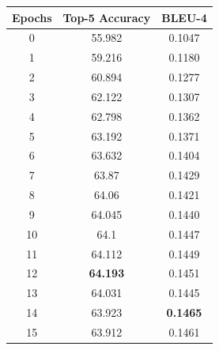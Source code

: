\documentclass[11pt,a4paper]{article}
\begin{document}
\begin{table}
\centering
\begin{tabular}{|c|c|c|} 
\hline
\rowcolor[rgb]{0.761,0.761,0.761} \textbf{Epochs} & \textbf{Top-5 Accuracy} & \textbf{BLEU-4}  \\ 
\hline
0                                                 & 55.982                  & 0.1047           \\ 
\hline
1                                                 & 59.216                  & 0.1180           \\ 
\hline
2                                                 & 60.894                  & 0.1277           \\ 
\hline
3                                                 & 62.122                  & 0.1307           \\ 
\hline
4                                                 & 62.798                  & 0.1362           \\ 
\hline
5                                                 & 63.192                  & 0.1371           \\ 
\hline
6                                                 & 63.632                  & 0.1404           \\ 
\hline
7                                                 & 63.87                   & 0.1429           \\ 
\hline
8                                                 & 64.06                   & 0.1421           \\ 
\hline
9                                                 & 64.045                  & 0.1440           \\ 
\hline
10                                                & 64.1                    & 0.1447           \\ 
\hline
11                                                & 64.112                  & 0.1449           \\ 
\hline
12                                                & \textbf{64.193}         & 0.1451           \\ 
\hline
13                                                & 64.031                  & 0.1445           \\ 
\hline
\rowcolor[rgb]{0.992,0.992,0.588} 14              & 63.923                  & \textbf{0.1465}  \\ 
\hline
15                                                & 63.912                  & 0.1461           \\ 

\end{tabular}
\end{table}
\end{document}
